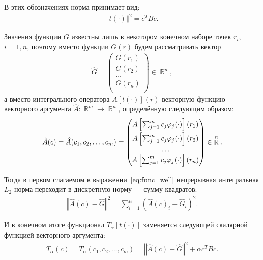 \documentclass[a4paper,14pt]{extarticle}
\DeclareMathOperator{\RR}{\mathbb{R}}
\newcommand{\norm}[1]{\left\Vert #1 \right\Vert}
\begin{document}
    В этих обозначениях норма принимает вид:
    \begin{gather*}
        \norm{t(\cdot)}^2
        = c^{T} B c.
    \end{gather*}

    Значения функции $G$ известны лишь в некотором конечном наборе точек $r_i$, $i = \overline{1, n}$, поэтому вместо функции $G(r)$ будем рассматривать вектор
    \begin{gather*}
        \hat{G} =
        \begin{pmatrix}
            G(r_1) \\
            G(r_2) \\
            \ldots \\
            G(r_n) \\
        \end{pmatrix}
        \in \RR^n,
    \end{gather*}
    а вместо интегрального оператора $A[t(\cdot)](r)$ векторную функцию векторного аргумента $\hat{A}: \RR^m \to \RR^n$, определённую следующим образом:
    \begin{gather*}
        \hat{A}(c) =
        \hat{A}(c_1, c_2, \ldots, c_m) =
        \begin{pmatrix}
            A\left[
                \sum_{j = 1}^m c_j \varphi_j(\cdot)
                \right] (r_1)
            \vspace{0.5ex} \\
            A\left[
                \sum_{j = 1}^m c_j \varphi_j(\cdot)
                \right] (r_2) \\
            \ldots \\
            A\left[
                \sum_{j = 1}^m c_j \varphi_j(\cdot)
                \right] (r_n) \\
        \end{pmatrix}
        \in \RR^n.
    \end{gather*}

    Тогда в первом слагаемом в выражении~\eqref{eq:func_well} непрерывная интегральная $L_2$-норма переходит в дискретную норму --- сумму квадратов:
    \begin{gather*}
        \norm{\hat{A}(c) - \hat{G}}^2
        = \sum_{i = 1}^n \left(
        \hat{A}(c)_i
        - \hat{G}_i
        \right)^2.
    \end{gather*}

    И в конечном итоге функционал $T_{\alpha}[t(\cdot)]$ заменяется следующей скалярной функцией векторного аргумента:
    \begin{gather}
        \label{eq:func_discr}
        T_{\alpha}(c)
        = T_{\alpha}(c_1, c_2, \ldots, c_m)
        = \norm{\hat{A}(c) - \hat{G}}^2
        + \alpha  c^{T} B c.
    \end{gather}
\end{document}
